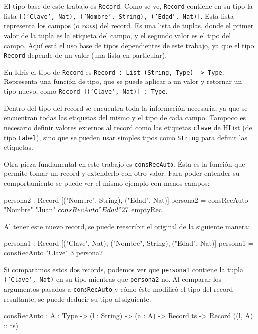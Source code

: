 El tipo base de este trabajo es \texttt{Record}. Como se ve, \texttt{Record} contiene en su tipo la lista \texttt{[('Clave', Nat), ('Nombre', String), ('Edad', Nat)]}. Esta lista representa los campos (o \textit{rows}) del record. Es una lista de tuplas, donde el primer valor de la tupla es la etiqueta del campo, y el segundo valor es el tipo del campo. Aquí está el uso base de tipos dependientes de este trabajo, ya que el tipo \texttt{Record} depende de un valor (una lista en particular).

En Idris el tipo de \texttt{Record} es \texttt{Record : List (String, Type) -> Type}. Representa una función de tipo, que se puede aplicar a un valor y retornar un tipo nuevo, como \texttt{Record [('Clave', Nat)] : Type}.

Dentro del tipo del record se encuentra toda la información necesaria, ya que se encuentran todas las etiquetas del mismo y el tipo de cada campo. Tampoco es necesario definir valores externos al record como las etiquetas \texttt{clave} de HList (de tipo \texttt{Label}), sino que se pueden usar simples tipos como \texttt{String} para definir las etiquetas.

Otra pieza fundamental en este trabajo es \texttt{consRecAuto}. Ésta es la función que permite tomar un record y extenderlo con otro valor. Para poder entender su comportamiento se puede ver el mismo ejemplo con menos campos:

\begin{code}
persona2 : Record [("Nombre", String), ("Edad", Nat)]
persona2 = consRecAuto "Nombre" "Juan" $
  consRecAuto "Edad" 27 $
  emptyRec
\end{code}

Al tener este nuevo record, se puede reescribir el original de la siguiente manera:

\begin{code}
persona1 : Record [("Clave", Nat), ("Nombre", String),
  ("Edad", Nat)]
persona1 = consRecAuto "Clave" 3 persona2
\end{code}

Si comparamos estos dos records, podemos ver que \texttt{persona1} contiene la tupla \texttt{('Clave', Nat)} en su tipo mientras que \texttt{persona2} no. Al comparar los argumentos pasados a \texttt{consRecAuto} y cómo éste modificó el tipo del record resultante, se puede deducir su tipo al siguiente:

\begin{code}
consRecAuto : {A : Type} -> (l : String) -> (a : A) ->
  Record ts -> Record ((l, A) :: ts)
\end{code}

